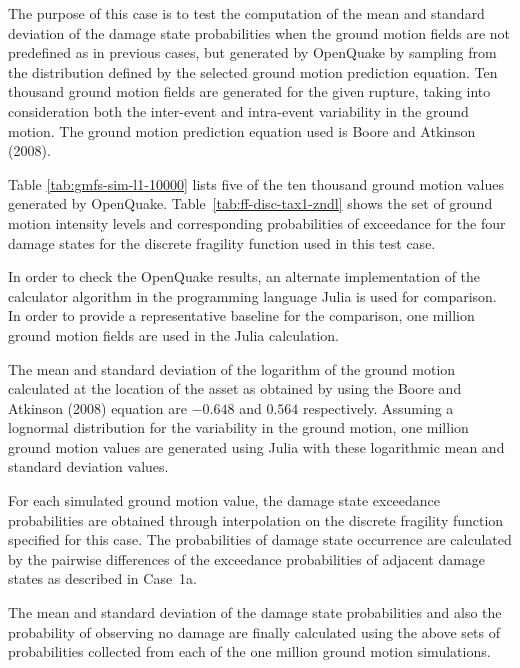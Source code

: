 The purpose of this case is to test the computation of the mean and standard deviation of the damage state probabilities when the ground motion fields are not predefined as in previous cases, but generated by OpenQuake by sampling from the distribution defined by the selected ground motion prediction equation. Ten thousand ground motion fields are generated for the given rupture, taking into consideration both the inter-event and intra-event variability in the ground motion. The ground motion prediction equation used is Boore and Atkinson (2008).

Table \ref{tab:gmfs-sim-l1-10000} lists five of the ten thousand ground motion values generated by OpenQuake. Table~\ref{tab:ff-disc-tax1-zndl} shows the set of ground motion intensity levels and corresponding probabilities of exceedance for the four damage states for the discrete fragility function used in this test case.

In order to check the OpenQuake results, an alternate implementation of the calculator algorithm in the programming language Julia is used for comparison. In order to provide a representative baseline for the comparison, one million ground motion fields are used in the Julia calculation.

The mean and standard deviation of the logarithm of the ground motion calculated at the location of the asset as obtained by using the Boore and Atkinson (2008) equation are $-0.648$ and $0.564$ respectively. Assuming a lognormal distribution for the variability in the ground motion, one million ground motion values are generated using Julia with these logarithmic mean and standard deviation values.

For each simulated ground motion value, the damage state exceedance probabilities are obtained through interpolation on the discrete fragility function specified for this case. The probabilities of damage state occurrence are calculated by the pairwise differences of the exceedance probabilities of adjacent damage states as described in Case~1a.

The mean and standard deviation of the damage state probabilities and also the probability of observing no damage are finally calculated using the above sets of probabilities collected from each of the one million ground motion simulations.